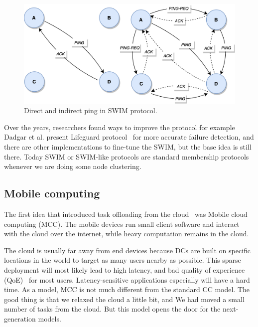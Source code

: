 \begin{figure}[H]
	\begin{center}
		\includegraphics[scale=0.7]{images/Figure15.png}
	\end{center}
	\vspace{-0.6cm}
	\caption{Direct and indirect ping in SWIM protocol.}
	\label{fig:fig15}
\end{figure}

\noindent
Over the years, researchers found ways to improve the protocol for example Dadgar et al. present Lifeguard protocol~\cite{DadgarPC18} for more accurate failure detection, and there are other implementations to fine-tune the SWIM, but the base idea is still there. Today SWIM or SWIM-like protocols are standard membership protocols whenever we are doing some node clustering.
%
%
\subsection{Mobile computing}\label{sec:mobile_computing}
%
The first idea that introduced task offloading from the cloud~\cite{FernandoLR13, LinLJL19} was Mobile cloud computing (MCC). The mobile devices run small client software and interact with the cloud over the internet, while heavy computation remains in the cloud. 

The cloud is usually far away from end devices because DCs are built on specific locations in the world to target as many users nearby as possible. This sparse deployment will most likely lead to high latency, and bad quality of experience (QoE)~\cite{LinLJL19} for most users. Latency-sensitive applications especially will have a hard time. As a model, MCC is not much different from the standard CC model. The good thing is that we relaxed the cloud a little bit, and We had moved a small number of tasks from the cloud. But this model opens the door for the next-generation models.

